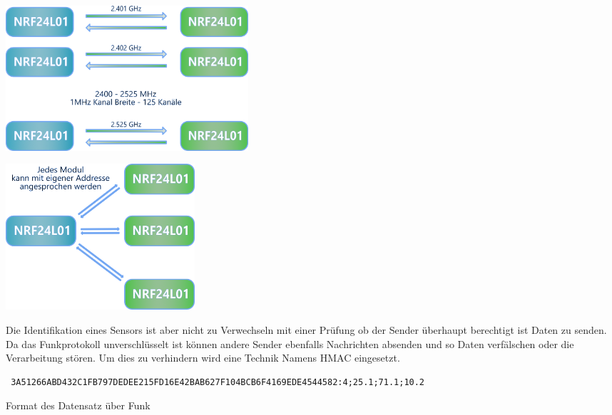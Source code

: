\documentclass[
  12pt, %
  a4paper, %
  twoside, %
  openany, %
  numbers=noenddot, %
  BCOR=5mm, %
  parskip=half*, %
  thesis, %
]{bfhbook}
\begin{document}
\begin{center}
    \begin{minipage}[b]{0.45\textwidth}
        \centering
        \includegraphics[width=9cm]{Bilder/NRF24Kommunikation.png}
        \captionsetup{justification=centering}
    \end{minipage}\hfill
    \begin{minipage}[b]{0.45\textwidth}
        \centering
        \includegraphics[width=7cm]{Bilder/NRF24Kommunikation-2.png} %
        \captionsetup{justification=centering}
    \end{minipage}
\end{center}
Die Identifikation eines Sensors ist aber nicht zu Verwechseln mit einer Prüfung ob der Sender überhaupt berechtigt ist Daten zu senden. Da das Funkprotokoll unverschlüsselt ist können andere Sender ebenfalls Nachrichten absenden und so Daten verfälschen oder die Verarbeitung stören. Um dies zu verhindern wird eine Technik Namens \Gls{HMAC} eingesetzt.
 \begin{listing}[h]
 \begin{verbatim}
 3A51266ABD432C1FB797DEDEE215FD16E42BAB627F104BCB6F4169EDE4544582:4;25.1;71.1;10.2
 \end{verbatim}
  \caption{Format des Datensatz über Funk}
 \end{listing}
\end{document}
